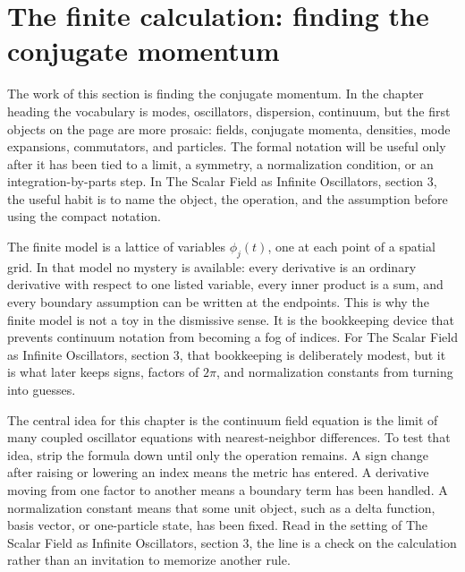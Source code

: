 \section{The finite calculation: finding the conjugate momentum}













The work of this section is finding the conjugate momentum.  In the chapter heading the vocabulary is modes, oscillators, dispersion, continuum, but the first objects on the page are more prosaic: fields, conjugate momenta, densities, mode expansions, commutators, and particles.  The formal notation will be useful only after it has been tied to a limit, a symmetry, a normalization condition, or an integration-by-parts step.  In The Scalar Field as Infinite Oscillators, section 3, the useful habit is to name the object, the operation, and the assumption before using the compact notation.

The finite model is a lattice of variables \(\phi_j(t)\), one at each point of a spatial grid.  In that model no mystery is available: every derivative is an ordinary derivative with respect to one listed variable, every inner product is a sum, and every boundary assumption can be written at the endpoints.  This is why the finite model is not a toy in the dismissive sense.  It is the bookkeeping device that prevents continuum notation from becoming a fog of indices.  For The Scalar Field as Infinite Oscillators, section 3, that bookkeeping is deliberately modest, but it is what later keeps signs, factors of \(2\pi\), and normalization constants from turning into guesses.

The central idea for this chapter is the continuum field equation is the limit of many coupled oscillator equations with nearest-neighbor differences.  To test that idea, strip the formula down until only the operation remains.  A sign change after raising or lowering an index means the metric has entered.  A derivative moving from one factor to another means a boundary term has been handled.  A normalization constant means that some unit object, such as a delta function, basis vector, or one-particle state, has been fixed.  Read in the setting of The Scalar Field as Infinite Oscillators, section 3, the line is a check on the calculation rather than an invitation to memorize another rule.

